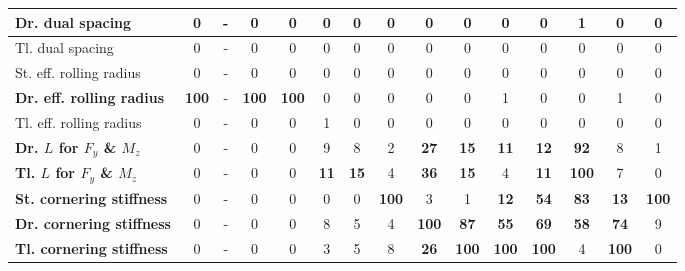 \begin{table}[H]
\begin{tabular}{|l|c|c|c|c|c|c|c|c|c|c|c|c|c|c|}
\hline
Dr. dual spacing & 0 & - & 0 & 0 & 0 & 0 & 0 & 0 & 0 & 0 & 0 & 1 & 0 & 0 \\
\hline
Tl. dual spacing & 0 & - & 0 & 0 & 0 & 0 & 0 & 0 & 0 & 0 & 0 & 0 & 0 & 0 \\
\hline
St. eff. rolling radius & 0 & - & 0 & 0 & 0 & 0 & 0 & 0 & 0 & 0 & 0 & 0 & 0 & 0 \\
\hline
\textcolor[rgb]{0.851, 0.373, 0.008}{\textbf{Dr. eff. rolling radius}} & \textcolor[rgb]{0.835, 0.369, 0.000}{\textbf{100}} & - & \textcolor[rgb]{0.835, 0.369, 0.000}{\textbf{100}} & \textcolor[rgb]{0.835, 0.369, 0.000}{\textbf{100}} & 0 & 0 & 0 & 0 & 0 & 1 & 0 & 0 & 1 & 0 \\
\hline
Tl. eff. rolling radius & 0 & - & 0 & 0 & 1 & 0 & 0 & 0 & 0 & 0 & 0 & 0 & 0 & 0 \\
\hline
\textcolor[rgb]{0.000, 0.447, 0.698}{\textbf{Dr. $L$ for $F_y$ \& $M_z$}} & 0 & - & 0 & 0 & 9 & 8 & 2 & \textcolor[rgb]{0.000, 0.620, 0.451}{\textbf{27}} & \textbf{15} & \textbf{11} & \textbf{12} & \textcolor[rgb]{0.000, 0.447, 0.698}{\textbf{92}} & 8 & 1 \\
\hline
\textcolor[rgb]{0.851, 0.373, 0.008}{\textbf{Tl. $L$ for $F_y$ \& $M_z$}} & 0 & - & 0 & 0 & \textbf{11} & \textbf{15} & 4 & \textcolor[rgb]{0.000, 0.620, 0.451}{\textbf{36}} & \textbf{15} & 4 & \textbf{11} & \textcolor[rgb]{0.835, 0.369, 0.000}{\textbf{100}} & 7 & 0 \\
\hline
\textcolor[rgb]{0.851, 0.373, 0.008}{\textbf{St. cornering stiffness}} & 0 & - & 0 & 0 & 0 & 0 & \textcolor[rgb]{0.835, 0.369, 0.000}{\textbf{100}} & 3 & 1 & \textbf{12} & \textcolor[rgb]{0.000, 0.447, 0.698}{\textbf{54}} & \textcolor[rgb]{0.000, 0.447, 0.698}{\textbf{83}} & \textbf{13} & \textcolor[rgb]{0.835, 0.369, 0.000}{\textbf{100}} \\
\hline
\textcolor[rgb]{0.851, 0.373, 0.008}{\textbf{Dr. cornering stiffness}} & 0 & - & 0 & 0 & 8 & 5 & 4 & \textcolor[rgb]{0.835, 0.369, 0.000}{\textbf{100}} & \textcolor[rgb]{0.000, 0.447, 0.698}{\textbf{87}} & \textcolor[rgb]{0.000, 0.447, 0.698}{\textbf{55}} & \textcolor[rgb]{0.000, 0.447, 0.698}{\textbf{69}} & \textcolor[rgb]{0.000, 0.447, 0.698}{\textbf{58}} & \textcolor[rgb]{0.000, 0.447, 0.698}{\textbf{74}} & 9 \\
\hline
\textcolor[rgb]{0.851, 0.373, 0.008}{\textbf{Tl. cornering stiffness}} & 0 & - & 0 & 0 & 3 & 5 & 8 & \textcolor[rgb]{0.000, 0.620, 0.451}{\textbf{26}} & \textcolor[rgb]{0.835, 0.369, 0.000}{\textbf{100}} & \textcolor[rgb]{0.835, 0.369, 0.000}{\textbf{100}} & \textcolor[rgb]{0.835, 0.369, 0.000}{\textbf{100}} & 4 & \textcolor[rgb]{0.835, 0.369, 0.000}{\textbf{100}} & 0 \\

\end{tabular}
\end{table}

